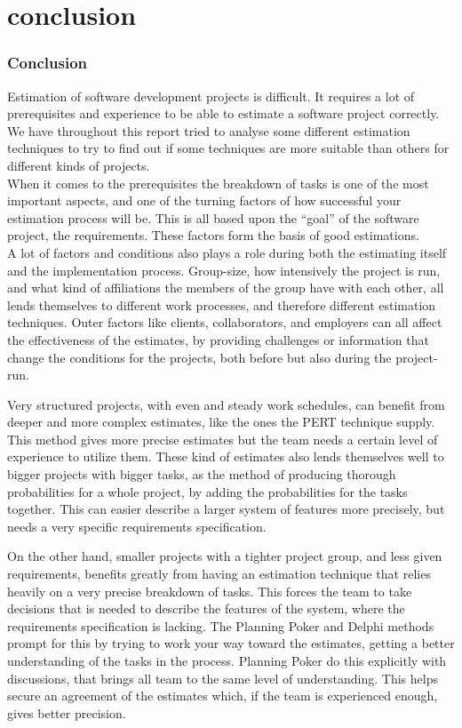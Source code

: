 \part{conclusion}
\section{Conclusion}
Estimation of software development projects is difficult. It requires a lot of prerequisites and experience to
be able to estimate a software project correctly. We have throughout this report tried to analyse some different
estimation techniques to try to find out if some techniques are more suitable than others for different kinds of
projects.\\

When it comes to the prerequisites the breakdown of tasks is one of the most important aspects, and one of the turning factors of how successful your estimation process will be. This is all based upon the ``goal'' of the software project, the requirements. These factors form the basis of good estimations.\\

A lot of factors and conditions also plays a role during both the estimating itself and the implementation process. Group-size, how intensively the project is run, and what kind of affiliations the members of the group have with each other, all lends themselves to different work processes, and therefore different estimation techniques. Outer factors like clients, collaborators, and employers can all affect the effectiveness of the estimates, by providing challenges or information that change the conditions for the projects, both before but also during the project-run. 

Very structured projects, with even and steady work schedules, can benefit from deeper and more complex estimates, like the ones the PERT technique supply. This method gives more precise estimates but the team needs a certain level of experience to utilize them. These kind of estimates also lends themselves well to bigger projects with bigger tasks, as the method of producing thorough probabilities for a whole project, by adding the probabilities for the tasks together. This can easier describe a larger system of features more precisely, but needs a very specific requirements specification.

On the other hand, smaller projects with a tighter project group, and less given requirements, benefits greatly from having an estimation technique that relies heavily on a very precise breakdown of tasks. This forces the team to take decisions that is needed to describe the features of the system, where the requirements specification is lacking. The Planning Poker and Delphi methods prompt for this by trying to work your way toward the estimates, getting a better understanding of the tasks in the process. Planning Poker do this explicitly with discussions, that brings all team to the same level of understanding. This helps secure an agreement of the estimates which, if the team is experienced enough, gives better precision.

